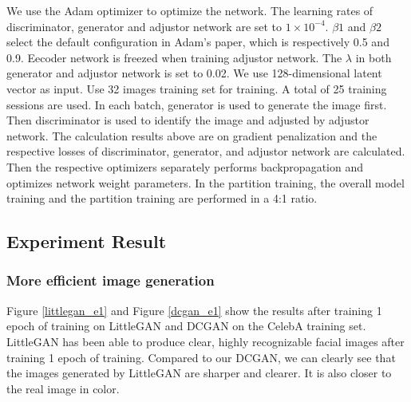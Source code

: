 We use the Adam optimizer to optimize the network.
The learning rates of discriminator, generator and adjustor network are set to $1\times10^{-4}$.
$\beta1$ and $\beta2$ select the default configuration in Adam's paper, which is respectively 0.5 and 0.9.
Eecoder network is freezed when training adjustor network.
The $\lambda$ in both generator and adjustor network is set to 0.02.
We use 128-dimensional latent vector as input.
Use 32 images training set for training.
A total of 25 training sessions are used.
In each batch, generator is used to generate the image first.
Then discriminator is used to identify the image and adjusted by adjustor network.
The calculation results above are on gradient penalization and the respective losses of discriminator, generator, and adjustor network are calculated.
Then the respective optimizers separately performs backpropagation and optimizes network weight parameters.
In the partition training, the overall model training and the partition training are performed in a 4:1 ratio.

\subsection{Experiment Result}
\subsubsection*{More efficient image generation} 
Figure \ref{littlegan_e1} and Figure \ref{dcgan_e1} show the results after training 1 epoch of training on LittleGAN and DCGAN on the CelebA training set.
LittleGAN has been able to produce clear, highly recognizable facial images after training 1 epoch of training.
Compared to our DCGAN, we can clearly see that the images generated by LittleGAN are sharper and clearer.
It is also closer to the real image in color.

